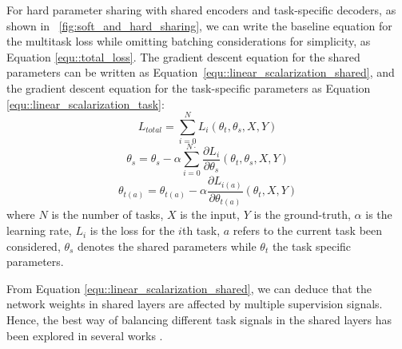 \documentclass[times,twocolumn,final]{elsarticle}
\newcommand{\figref}[1]{\figurename~\ref{#1}}
\begin{document}
For hard parameter sharing with shared encoders and task-specific decoders, as shown in  \figref{fig:soft_and_hard_sharing}, we can write the baseline equation for the multitask loss while omitting batching considerations for simplicity, as Equation \eqref{equ::total_loss}. 
The gradient descent equation for the shared parameters can be written as Equation~\eqref{equ::linear_scalarization_shared}, and the gradient descent equation for the task-specific parameters as Equation \eqref{equ::linear_scalarization_task}:
\begin{equation} \label{equ::total_loss}
    L_{total}=\sum ^{N}_{i=0}L_{i}\left( \theta _{t},\theta _{s},X,Y\right)
\end{equation}
\begin{equation} \label{equ::linear_scalarization_shared}
    \theta _{s}=\theta_{s}-\alpha \sum ^{N\cdot }_{i=0}\dfrac{\partial L_{i}}{\partial \theta _{s}}\left( \theta _{t},\theta _{s},X,Y\right)
\end{equation}
\begin{equation} \label{equ::linear_scalarization_task}
    \theta _{t\left( a\right) }=\theta_{t\left( a\right) }-\alpha \dfrac{\partial L_{i\left( a\right)} }{\partial \theta _{t\left( a\right)} }\left( \theta _{t},X,Y\right)
\end{equation}
where $N$ is the number of tasks, $X$ is the input, $Y$ is the ground-truth, $\alpha$ is the learning rate, $L_i$ is the loss for the $i$th task, $a$ refers to the current task been considered,  $\theta _{s}$ denotes the shared parameters while $\theta _{t}$ the task specific parameters. 

From Equation \eqref{equ::linear_scalarization_shared}, we can deduce that the network weights in shared layers are affected by multiple supervision signals. Hence, the best way of balancing different task signals in the shared layers has been explored in several works \citep{MTMO_koltun,uncertainty_weighting,Dynamic_task_prioritization}.
\end{document}
